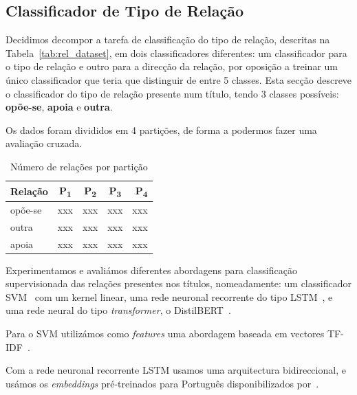 \documentclass[a4paper, twocolumn, 11pt, twoside]{article}
\begin{document}
\subsection{Classificador de Tipo de Relação}
\label{subsec:rel_classifier}

Decidimos decompor a tarefa de classificação do tipo de relação, descritas na Tabela~\ref{tab:rel_dataset}, em dois classificadores diferentes: um classificador para o tipo de relação e outro para a direcção da relação, por oposição a treinar um único classificador que teria que distinguir de entre 5 classes. Esta secção descreve o classificador do tipo de relação presente num título, tendo 3 classes possíveis: \textbf{opõe-se}, \textbf{apoia} e \textbf{outra}.

Os dados foram divididos em 4 partições, de forma a podermos fazer uma avaliação cruzada. 

\begin{table}[!h]
    \begin{center}
    \begin{tabular}{l cccr}
        {\bf Relação} & {\bf P\textsubscript{1}}&  {\bf P\textsubscript{2}}  & {\bf P\textsubscript{3}} & {\bf P\textsubscript{4}} \\
        \hline
        opõe-se          &  xxx  &  xxx  &  xxx  & xxx \\
        outra            &  xxx  &  xxx  &  xxx  & xxx \\
        apoia            &  xxx  &  xxx  &  xxx  & xxx \\
		\hline
    \end{tabular}
	\caption{Número de relações por partição}
	\end{center}
\end{table}


Experimentamos e avaliámos diferentes abordagens para classificação supervisionada das relações presentes nos títulos, nomeadamente: um classificador SVM~\citep{cortes1995support} com um kernel linear, uma rede neuronal recorrente do tipo LSTM~\citep{10.1162/neco.1997.9.8.1735}, e uma rede neural do tipo \textit{transformer}, o DistilBERT~\citep{9463516}.

Para o SVM utilizámos como \textit{features} uma abordagem baseada em vectores TF-IDF~\citep{DBLP:journals/ipm/SaltonB88}.

Com a rede neuronal recorrente LSTM usamos uma arquitectura bidireccional, e usámos os \textit{embeddings} pré-treinados para Português disponibilizados por~\cite{hartmann-etal-2017-portuguese}.
\end{document}

